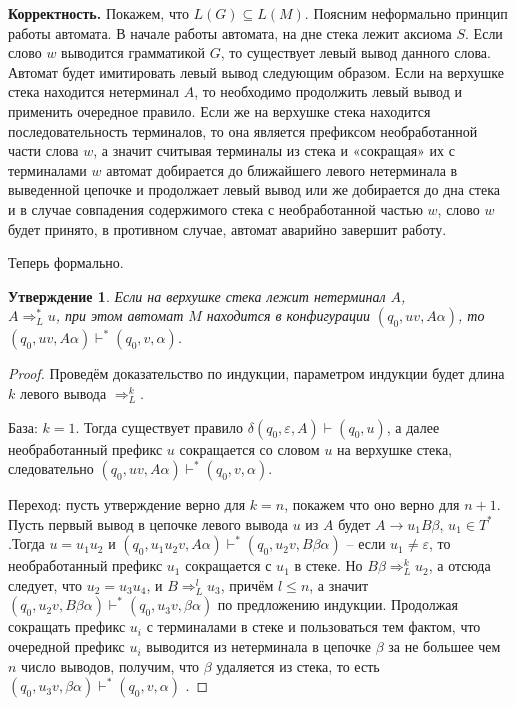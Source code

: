 \documentclass[12pt]{article}
\theoremstyle{definiton}
\newtheorem{Claim}{Утверждение}
\theoremstyle{definition}
\theoremstyle{definition}
\let\leq\leqslant
\let\eps\varepsilon
\let\yield\Rightarrow
\begin{document}
\textbf{Корректность.} Покажем, что $L(G) \subseteq L(M)$. Поясним неформально принцип работы автомата. В начале работы автомата, на дне стека лежит аксиома $S$. Если слово $w$ выводится грамматикой $G$, то существует левый вывод данного слова. Автомат будет имитировать левый вывод следующим образом. Если на верхушке стека находится нетерминал $A$, то необходимо продолжить левый вывод и применить очередное правило. Если же на верхушке стека находится последовательность терминалов, то она является префиксом необработанной части слова $w$, а значит считывая терминалы из стека и «сокращая» их с терминалами $w$ автомат добирается до ближайшего левого нетерминала в выведенной цепочке и продолжает левый вывод или же добирается до дна стека и в случае совпадения содержимого стека с необработанной частью $w$, слово $w$ будет принято, в противном случае, автомат аварийно завершит работу. 


Теперь формально.
\begin{Claim}\label{gen_to_conf}
	Если на верхушке стека лежит нетерминал $A$, \\ $A \yield^*_L u$, при этом автомат $M$ находится в конфигурации $(q_0, uv, A\alpha)$,  то $(q_0, uv, A\alpha) \vdash^* (q_0, v, \alpha)$.
\end{Claim}
\begin{proof}
	

  Проведём доказательство по индукции, параметром индукции будет длина $k$ левого вывода $\yield_L^k$. 

База: $k = 1$. Тогда существует правило $\delta(q_0,\eps,A) \vdash (q_0,u)$, а далее необработанный префикс $u$ сокращается со словом $u$ на верхушке стека, следовательно $(q_0, uv, A\alpha) \vdash^* (q_0, v, \alpha)$.

Переход: пусть утверждение верно для $k = n$, покажем что оно верно для $n+1$. Пусть первый вывод в цепочке левого вывода $u$ из $A$ будет $A \to u_1B\beta$,  $u_1 \in T^*$.Тогда $u = u_1u_2$ и $(q_0, u_1u_2v, A\alpha) \vdash^* (q_0, u_2v, B\beta\alpha)$ -- если $u_1 \neq \eps$, то необработанный префикс $u_1$ сокращается с $u_1$ в стеке. Но $B\beta \yield_L^k u_2 $, а отсюда следует, что $u_2 = u_3u_4$, и $B \yield^l_L u_3$, причём $l \leq n$, а значит $(q_0, u_2v, B\beta\alpha) \vdash^* (q_0, u_3v, \beta\alpha)$ по предложению индукции.  Продолжая сокращать префикс $u_i$ с терминалами в стеке и пользоваться тем фактом, что очередной префикс $u_i$ выводится из нетерминала в цепочке $\beta$ за не большее чем $n$ число выводов, получим, что $\beta$ удаляется из стека, то есть $ (q_0, u_3v, \beta\alpha) \vdash^* (q_0, v, \alpha)$ .
\end{proof}
\end{document}

